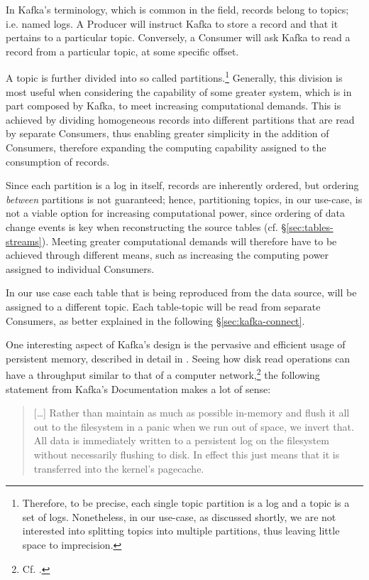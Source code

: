 In Kafka's terminology, which is common in the field, records belong to topics; i.e. named logs.
A Producer will instruct Kafka to store a record and that it pertains to a particular topic.
Conversely, a Consumer will ask Kafka to read a record from a particular topic, at some specific offset.

A topic is further divided into so called partitions.\footnote{%
	Therefore, to be precise, each single topic partition is a log and a topic is a set of logs.
	Nonetheless, in our use-case, as discussed shortly, we are not interested into splitting topics into multiple partitions, thus leaving little space to imprecision.
}
Generally, this division is most useful when considering the capability of some greater system, which is in part composed by Kafka, to meet increasing computational demands.
This is achieved by dividing homogeneous records into different partitions that are read by separate Consumers, thus enabling greater simplicity in the addition of Consumers, therefore expanding the computing capability assigned to the consumption of records.

Since each partition is a log in itself, records are inherently ordered, but ordering \emph{between} partitions is not guaranteed; hence, partitioning topics, in our use-case, is not a viable option for increasing computational power, since ordering of data change events is key when reconstructing the source tables (cf. \S \ref{sec:tables-streams}).
Meeting greater computational demands will therefore have to be achieved through different means, such as increasing the computing power assigned to individual Consumers.

In our use case each table that is being reproduced from the data source, will be assigned to a different topic.
Each table-topic will be read from separate Consumers, as better explained in the following \S \ref{sec:kafka-connect}.

One interesting aspect of Kafka's design is the pervasive and efficient usage of persistent memory, described in detail in \cite[\S 4.2, and \S 4.3]{kafka-docs}.
Seeing how disk read operations can have a throughput similar to that of a computer network,\footnote{%
	Cf. \cite{pathologies-big-data}.
} the following statement from Kafka's Documentation makes a lot of sense:
\begin{quote}
	[\ldots] Rather than maintain as much as possible in-memory and flush it all out to the filesystem in a panic when we run out of space, we invert that. All data is immediately written to a persistent log on the filesystem without necessarily flushing to disk. In effect this just means that it is transferred into the kernel's pagecache.
\end{quote}

